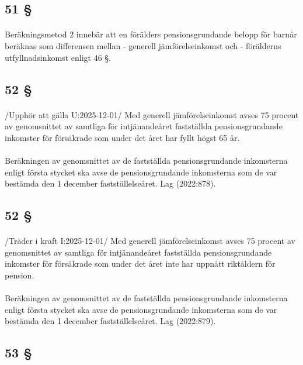 \documentclass[a4paper,notitlepage,openany,10pt]{book}
\begin{document}
\subsection*{51 §}
\paragraph*{}
Beräkningsmetod 2 innebär att en förälders pensionsgrundande belopp för barnår beräknas som differensen mellan
\newline - generell jämförelseinkomst och
\newline - förälderns utfyllnadsinkomst enligt 46 §.
\subsection*{52 §}
\paragraph*{}
/Upphör att gälla U:2025-12-01/
Med generell jämförelseinkomst avses 75 procent av genomsnittet av samtliga för intjänandeåret fastställda pensionsgrundande inkomster för försäkrade som under det året har fyllt högst 65 år.
\paragraph*{}
Beräkningen av genomsnittet av de fastställda pensionsgrundande inkomsterna enligt första stycket ska avse de pensionsgrundande inkomsterna som de var bestämda den 1 december fastställelseåret.
Lag (2022:878).
\subsection*{52 §}
\paragraph*{}
/Träder i kraft I:2025-12-01/
Med generell jämförelseinkomst avses 75 procent av genomsnittet av samtliga för intjänandeåret fastställda pensionsgrundande inkomster för försäkrade som under det året inte har uppnått riktåldern för pension.
\paragraph*{}
Beräkningen av genomsnittet av de fastställda pensionsgrundande inkomsterna enligt första stycket ska avse de pensionsgrundande inkomsterna som de var bestämda den 1 december fastställelseåret.
Lag (2022:879).
\subsection*{53 §}
\end{document}
